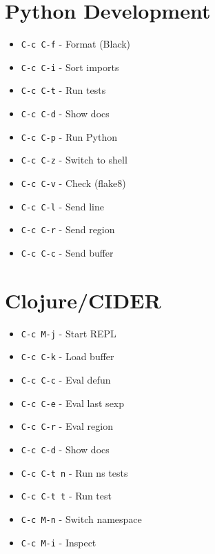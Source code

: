 \documentclass[6pt,landscape]{article}
\newcommand{\key}[1]{\texttt{#1}}
\begin{document}
\begin{multicols*}{5}
\section*{Python Development}
\begin{itemize}[leftmargin=*,itemsep=0pt,parsep=0pt,topsep=0pt]
\item \key{C-c C-f} - Format (Black)
\item \key{C-c C-i} - Sort imports
\item \key{C-c C-t} - Run tests
\item \key{C-c C-d} - Show docs
\item \key{C-c C-p} - Run Python
\item \key{C-c C-z} - Switch to shell
\item \key{C-c C-v} - Check (flake8)
\item \key{C-c C-l} - Send line
\item \key{C-c C-r} - Send region
\item \key{C-c C-c} - Send buffer
\end{itemize}

\section*{Clojure/CIDER}
\begin{itemize}[leftmargin=*,itemsep=0pt,parsep=0pt,topsep=0pt]
\item \key{C-c M-j} - Start REPL
\item \key{C-c C-k} - Load buffer
\item \key{C-c C-c} - Eval defun
\item \key{C-c C-e} - Eval last sexp
\item \key{C-c C-r} - Eval region
\item \key{C-c C-d} - Show docs
\item \key{C-c C-t n} - Run ns tests
\item \key{C-c C-t t} - Run test
\item \key{C-c M-n} - Switch namespace
\item \key{C-c M-i} - Inspect
\end{itemize}


\end{multicols*}
\end{document}
